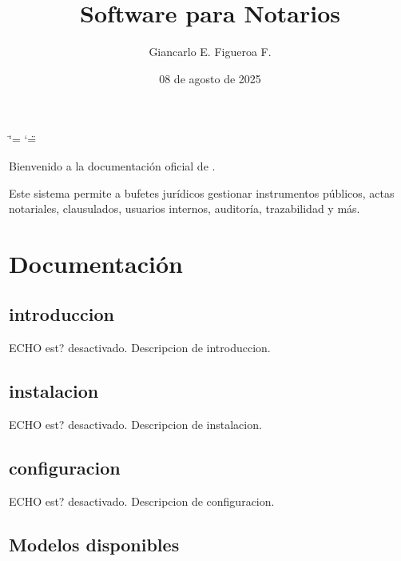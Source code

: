 \documentclass[letterpaper,10pt,spanish]{sphinxmanual}
\title{Software para Notarios}
\date{08 de agosto de 2025}
\author{Giancarlo E.\@{} Figueroa F.\@{}}
\begin{document}
\ifdefined\shorthandoff
  \ifnum\catcode`\=\string=\active\shorthandoff{=}\fi
  \ifnum\catcode`\"=\active{}\fi
\fi

\pagestyle{empty}
\sphinxmaketitle
\pagestyle{plain}
\sphinxtableofcontents
\pagestyle{normal}
\label{\detokenize{index::doc}}


\sphinxAtStartPar
Bienvenido a la documentación oficial de .

\sphinxAtStartPar
Este sistema permite a bufetes jurídicos gestionar instrumentos públicos, actas notariales, clausulados, usuarios internos, auditoría, trazabilidad y más.


\chapter{Documentación}
\label{\detokenize{index:documentacion}}
\sphinxstepscope


\section{introduccion}
\label{\detokenize{introduccion:introduccion}}\label{\detokenize{introduccion::doc}}
\sphinxAtStartPar
ECHO est? desactivado.
Descripcion de introduccion.

\sphinxstepscope


\section{instalacion}
\label{\detokenize{instalacion:instalacion}}\label{\detokenize{instalacion::doc}}
\sphinxAtStartPar
ECHO est? desactivado.
Descripcion de instalacion.

\sphinxstepscope


\section{configuracion}
\label{\detokenize{configuracion:configuracion}}\label{\detokenize{configuracion::doc}}
\sphinxAtStartPar
ECHO est? desactivado.
Descripcion de configuracion.

\sphinxstepscope


\section{Modelos disponibles}
\label{\detokenize{modelos/index:modelos-disponibles}}\label{\detokenize{modelos/index::doc}}
\sphinxstepscope
\end{document}
